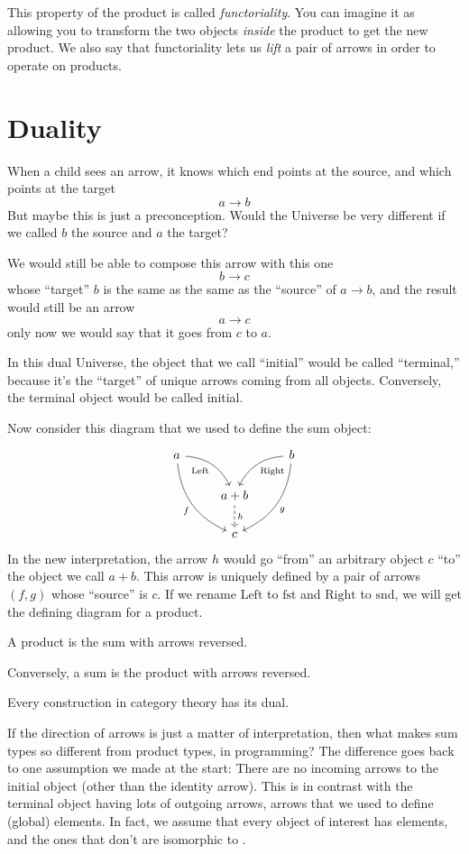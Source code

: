 \documentclass[DaoFP]{subfiles}
\begin{document}
This property of the product is called \emph{functoriality}. You can imagine it as allowing you to transform the two objects \emph{inside} the product to get the new product. We also say that functoriality lets us \emph{lift} a pair of arrows in order to operate on products.

\section{Duality}

When a child sees an arrow, it knows which end points at the source, and which points at the target
\[a \to b \]
But maybe this is just a preconception. Would the Universe be very different if we called $b$ the source and $a$ the target? 

We would still be able to compose this arrow with this one
\[b \to c\]
whose ``target'' $b$ is the same as the same as the ``source'' of $a \to b$, and the result would still be an arrow 
\[a \to c\]
 only now we would say that it goes from $c$ to $a$.

In this dual Universe, the object that we call ``initial'' would be called ``terminal,'' because it's the ``target'' of unique arrows coming from all objects. Conversely, the terminal object would be called initial.

Now consider this diagram that we used to define the sum object:
\[
 \begin{tikzcd}
 a
 \arrow[dr,  bend left, "\text{Left}"']
 \arrow[ddr, bend right, "f"']
 && b
 \arrow[dl, bend right, "\text{Right}"]
 \arrow[ddl, bend left, "g"]
 \\
&a + b
\arrow[d, dashed, "h"]
\\
& c
 \end{tikzcd}
\]
In the new interpretation, the arrow $h$ would go ``from'' an arbitrary object $c$ ``to'' the object we call $a + b$. This arrow is uniquely defined by a pair of arrows $(f, g)$ whose ``source'' is $c$. If we rename $\text{Left}$ to $\text{fst}$ and $\text{Right}$ to $\text{snd}$, we will get  the defining diagram for a product. 

A product is the sum with arrows reversed. 

Conversely, a sum is the product with arrows reversed. 

\medskip

Every construction in category theory has its dual.

\medskip

If the direction of arrows is just a matter of interpretation, then what makes sum types so different from product types, in programming? The difference goes back to one assumption we made at the start: There are no incoming arrows to the initial object (other than the identity arrow). This is in contrast with the terminal object having lots of outgoing arrows, arrows that we used to define (global) elements. In fact, we assume that every object of interest has elements, and the ones that don't are isomorphic to . 
\end{document}
